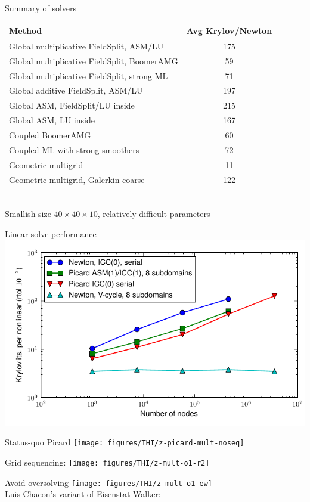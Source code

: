 \begin{frame}{Summary of solvers}
  \centering
  \begin{tabular}{|l|c|}
    \hline
    Method & Avg Krylov/Newton \\
    \hline
    Global multiplicative FieldSplit, ASM/LU & 175 \\
    Global multiplicative FieldSplit, BoomerAMG & 59 \\
    Global multiplicative FieldSplit, strong ML & 71 \\
    Global additive FieldSplit, ASM/LU & 197 \\
    Global ASM, FieldSplit/LU inside & 215 \\
    Global ASM, LU inside & 167 \\
    Coupled BoomerAMG & 60 \\
    Coupled ML with strong smoothers & 72 \\
    Geometric multigrid & 11 \\
    Geometric multigrid, Galerkin coarse & 122 \\
    \hline
  \end{tabular} \\
  {Smallish size $40\times 40\times 10$, relatively difficult parameters}
\end{frame}

\begin{frame}{Linear solve performance}
  \centering
  \includegraphics[width=\textwidth]{figures/THI/linear4}
\end{frame}

\begin{frame}{Status-quo Picard}
  \texttt{[image: figures/THI/z-picard-mult-noseq]}
\end{frame}

\begin{frame}{Grid sequencing: }
    \texttt{[image: figures/THI/z-mult-o1-r2]}
\end{frame}

\begin{frame}{Avoid oversolving}
    \texttt{[image: figures/THI/z-mult-o1-ew]} \\
    Luis Chacon's variant of Eisenstat-Walker: \\
\end{frame}
